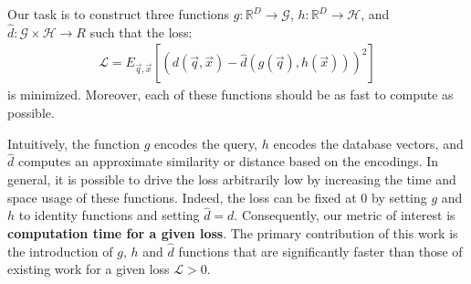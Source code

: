 Our task is to construct three functions $g: \mathbb{R}^D \rightarrow \mathcal{G}$, $h: \mathbb{R}^D \rightarrow \mathcal{H}$, and $\hat{d}: \mathcal{G} \times \mathcal{H} \rightarrow R$ such that the loss:
\begin{align}
    \mathcal{L} = E_{\vec{q},\vec{x}}[(d(\vec{q}, \vec{x}) - \hat{d}(g(\vec{q}), h(\vec{x})))^2]
\end{align}
is minimized. Moreover, each of these functions should be as fast to compute as possible.

Intuitively, the function $g$ encodes the query, $h$ encodes the database vectors, and $\hat{d}$ computes an approximate similarity or distance based on the encodings. In general, it is possible to drive the loss arbitrarily low by increasing the time and space usage of these functions. Indeed, the loss can be fixed at 0 by setting $g$ and $h$ to identity functions and setting $\hat{d} = d$. Consequently, our metric of interest is \textbf{computation time for a given loss}. The primary contribution of this work is the introduction of $g$, $h$ and $\hat{d}$ functions that are significantly faster than those of existing work for a given loss $\mathcal{L} > 0$.





